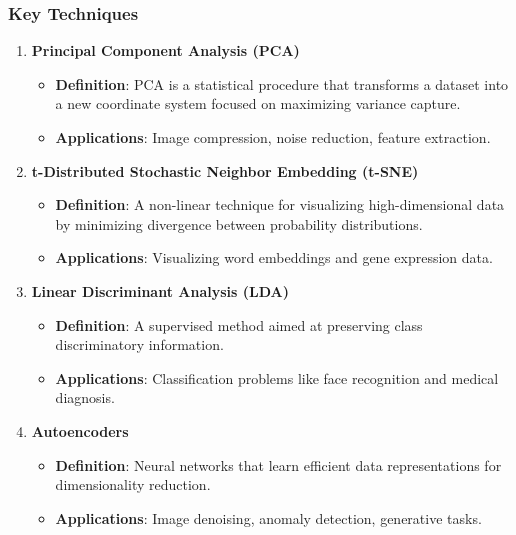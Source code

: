 \documentclass[aspectratio=169]{beamer}
\begin{document}
\begin{frame}[fragile]
    \frametitle{Key Techniques}
    \begin{enumerate}
        \item \textbf{Principal Component Analysis (PCA)}
        \begin{itemize}
            \item \textbf{Definition}: PCA is a statistical procedure that transforms a dataset into a new coordinate system focused on maximizing variance capture.
            \item \textbf{Applications}: Image compression, noise reduction, feature extraction.
        \end{itemize}
        
        \item \textbf{t-Distributed Stochastic Neighbor Embedding (t-SNE)}
        \begin{itemize}
            \item \textbf{Definition}: A non-linear technique for visualizing high-dimensional data by minimizing divergence between probability distributions.
            \item \textbf{Applications}: Visualizing word embeddings and gene expression data.
        \end{itemize}
        
        \item \textbf{Linear Discriminant Analysis (LDA)}
        \begin{itemize}
            \item \textbf{Definition}: A supervised method aimed at preserving class discriminatory information.
            \item \textbf{Applications}: Classification problems like face recognition and medical diagnosis.
        \end{itemize}

        \item \textbf{Autoencoders}
        \begin{itemize}
            \item \textbf{Definition}: Neural networks that learn efficient data representations for dimensionality reduction.
            \item \textbf{Applications}: Image denoising, anomaly detection, generative tasks.
        \end{itemize}
    \end{enumerate}
\end{frame}
\end{document}
